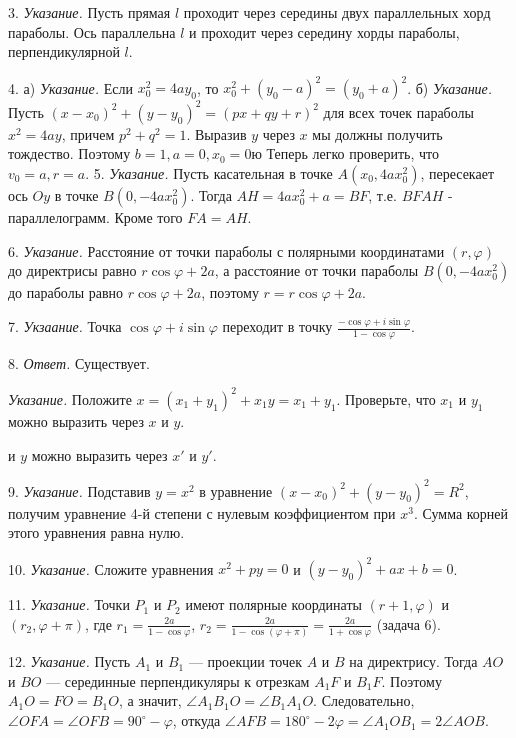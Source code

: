 3. \textit{Указание.} Пусть прямая $l$ проходит через середины двух параллельных хорд параболы. Ось параллельна $l$ и проходит через середину хорды параболы, перпендикулярной $l$.

4. а) \textit{Указание.} Если $x_0^2 = 4ay_0$, то $x_0^2 + (y_0 - a)^2 = (y_0 + a)^2$.
б) \textit{Указание.} Пусть $(x - x_0)^2 + (y - y_0)^2 = (px + qy + r)^2$ для всех точек параболы $x^2 = 4ay$, причем $p^2 + q^2 = 1$. Выразив $y$ через $x$ мы должны получить тождество. Поэтому $b = 1, a = 0, x_0 = 0$ю Теперь легко проверить, что $v_0 = a, r = a.$
5. \textit{Указание.} Пусть касательная в точке $A(x_0, 4ax_0^2)$, пересекает ось $Oy$ в точке $B(0, -4ax_0^2)$. Тогда $AH = 4ax_0^2 + a = BF$, т.е. $BFAH$ - параллелограмм. Кроме того $FA = AH$.

6. \textit{Указание.} Расстояние от точки параболы с полярными координатами $(r, \varphi)$ до директрисы равно $r\cos\varphi + 2a$, а расстояние от точки параболы $B(0, -4ax_0^2)$ до параболы равно $r\cos\varphi + 2a$, поэтому $r = r\cos\varphi + 2a$.

7. \textit{Укзаание.} Точка $\cos\varphi + i\sin\varphi$ переходит в точку $\frac{-\cos\varphi + i\sin\varphi}{1 - \cos\varphi}$.

8. \textit{Ответ.} Существует.

\textit{Указание.} Положите $x = (x_1 + y_1)^2 + x_1y = x_1 + y_1$. Проверьте, что $x_1$ и $y_1$ можно выразить через $x$ и $y$.

 и $y$ можно выразить через $x'$ и $y'$.


9. \textit{Указание.} Подставив $y = x^2$ в уравнение $(x - x_0)^2 + (y - y_0)^2 = R^2$, получим уравнение 4-й степени с нулевым коэффициентом при $x^3$. Сумма корней этого уравнения равна нулю.


10. \textit{Указание.} Сложите уравнения $x^2 + py = 0$ и $(y - y_0)^2 + ax + b = 0$.

11. \textit{Указание.} Точки $P_1$ и $P_2$ имеют полярные координаты $(r+1, \varphi)$ и $(r_2, \varphi + \pi)$, где $r_1 = \frac{2a}{1 - \cos \varphi}$, $r_2 = \frac{2a}{1 - \cos(\varphi + \pi)} = \frac{2a}{1 + \cos \varphi}$ (задача 6).

12. \textit{Указание.} Пусть $A_1$ и $B_1$ — проекции точек $A$ и $B$ на директрису. Тогда $AO$ и $BO$ — серединные перпендикуляры к отрезкам $A_1F$ и $B_1F$. Поэтому $A_1O = FO = B_1O$, а значит, $\angle A_1B_1O = \angle B_1A_1O$. Следовательно, $\angle OFA = \angle OFB = 90^\circ - \varphi$, откуда $\angle AFB = 180^\circ - 2\varphi = \angle A_1 O B_1 = 2\angle AOB$.

